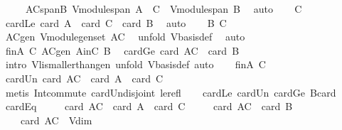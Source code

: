 \begin{isabellebody}
\ \ \ \ \ ACspanB{\isacharcolon}\ {\isachardoublequoteopen}{\isacharparenleft}V{\isachardot}module{\isachardot}span\ {\isacharparenleft}A\ {\isasymunion}\ C{\isacharparenright}\ {\isacharequal}\ V{\isachardot}module{\isachardot}span\ B{\isacharparenright}{\isachardoublequoteclose}\ \isamarkupfalse%
\ auto\isanewline
\ \ \isamarkupfalse%
\ C\ \isamarkupfalse%
\ cardLe{\isacharcolon}\ {\isachardoublequoteopen}card\ A\ {\isacharplus}\ card\ C\ {\isasymle}\ card\ B{\isachardoublequoteclose}\ \isamarkupfalse%
\ auto\isanewline
\ \ \isamarkupfalse%
\ B\ C\ \isamarkupfalse%
\ ACgen{\isacharcolon}\ {\isachardoublequoteopen}V{\isachardot}module{\isachardot}gen{\isacharunderscore}set\ {\isacharparenleft}A{\isasymunion}C{\isacharparenright}{\isachardoublequoteclose}\ \isamarkupfalse%
\ {\isacharparenleft}unfold\ V{\isachardot}basis{\isacharunderscore}def{\isacharparenright}\ \isamarkupfalse%
\ auto\isanewline
\ \ \isamarkupfalse%
\ finA\ C\ ACgen\ AinC\ B\ \isamarkupfalse%
\ cardGe{\isacharcolon}\ {\isachardoublequoteopen}card\ {\isacharparenleft}A{\isasymunion}C{\isacharparenright}\ {\isasymge}\ card\ B{\isachardoublequoteclose}\ \isamarkupfalse%
\ {\isacharparenleft}intro\ V{\isachardot}li{\isacharunderscore}smaller{\isacharunderscore}than{\isacharunderscore}gen{\isacharcomma}\ unfold\ V{\isachardot}basis{\isacharunderscore}def{\isacharcomma}\ auto{\isacharparenright}\isanewline
\ \ \isamarkupfalse%
\ finA\ C\ \isamarkupfalse%
\ cardUn{\isacharcolon}\ {\isachardoublequoteopen}card\ {\isacharparenleft}A{\isasymunion}C{\isacharparenright}{\isasymle}\ \ card\ A\ {\isacharplus}\ card\ C{\isachardoublequoteclose}\isanewline
\ \ \ \ \isamarkupfalse%
\ {\isacharparenleft}metis\ Int{\isacharunderscore}commute\ card{\isacharunderscore}Un{\isacharunderscore}disjoint\ le{\isacharunderscore}refl{\isacharparenright}\isanewline
\ \ \isamarkupfalse%
\ cardLe\ cardUn\ cardGe\ Bcard\ \isamarkupfalse%
\ cardEq{\isacharcolon}\ \isanewline
\ \ \ \ {\isachardoublequoteopen}card\ {\isacharparenleft}A{\isasymunion}C{\isacharparenright}\ {\isacharequal}\ card\ A\ {\isacharplus}\ card\ C{\isachardoublequoteclose}\ \isanewline
\ \ \ \ {\isachardoublequoteopen}card\ {\isacharparenleft}A{\isasymunion}C{\isacharparenright}\ {\isacharequal}\ card\ B{\isachardoublequoteclose}\ \isanewline
\ \ \ \ {\isachardoublequoteopen}card\ {\isacharparenleft}A{\isasymunion}C{\isacharparenright}\ {\isacharequal}\ V{\isachardot}dim{\isachardoublequoteclose}\ \isanewline

\end{isabellebody}

